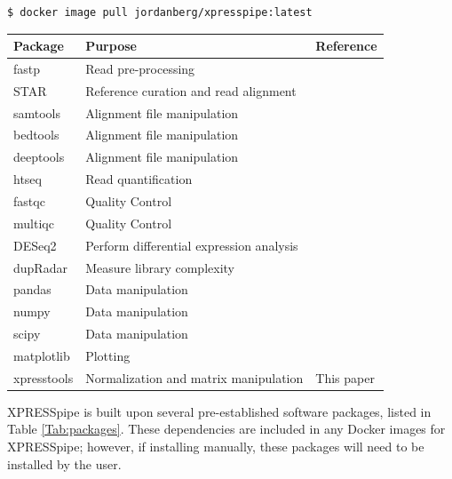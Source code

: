 \documentclass[11pt, a4paper, oneside]{article}
\begin{document}
\begin{lstlisting}[language=bash, caption=curateReference example]
$ docker image pull jordanberg/xpresspipe:latest
\end{lstlisting}

\begin{tabular}{p{2.4cm}p{7.5cm}p{3cm}}
 \textbf{Package} & \textbf{Purpose} & \textbf{Reference} \\
 \hline
 fastp & Read pre-processing & \cite{fastp} \\
 \hline
 STAR & Reference curation and read alignment & \cite{star} \\
 \hline
 samtools & Alignment file manipulation & \cite{samtools} \\
 \hline
 bedtools & Alignment file manipulation & \cite{bedtools} \\
 \hline
 deeptools & Alignment file manipulation & \cite{deeptools} \\
 \hline
 htseq & Read quantification & \cite{htseq} \\
 \hline
 fastqc & Quality Control & \cite{fastqc} \\
 \hline
 multiqc & Quality Control & \cite{multiqc} \\
 \hline
 DESeq2 & Perform differential expression analysis & \cite{deseq2} \\
 \hline
 dupRadar & Measure library complexity & \cite{dupradar} \\
 \hline
 pandas & Data manipulation & \cite{pandas} \\
 \hline
 numpy & Data manipulation & \cite{numpy1, numpy2} \\
 \hline
 scipy & Data manipulation & \cite{scipy} \\
 \hline
 matplotlib & Plotting & \cite{matplotlib} \\
 \hline
 xpresstools & Normalization and matrix manipulation & This paper \\
\end{tabular}
\newline

XPRESSpipe is built upon several pre-established software packages, listed in Table \ref{Tab:packages}. These dependencies are included in any Docker images for XPRESSpipe; however, if installing manually, these packages will need to be installed by the user.
\end{document}
